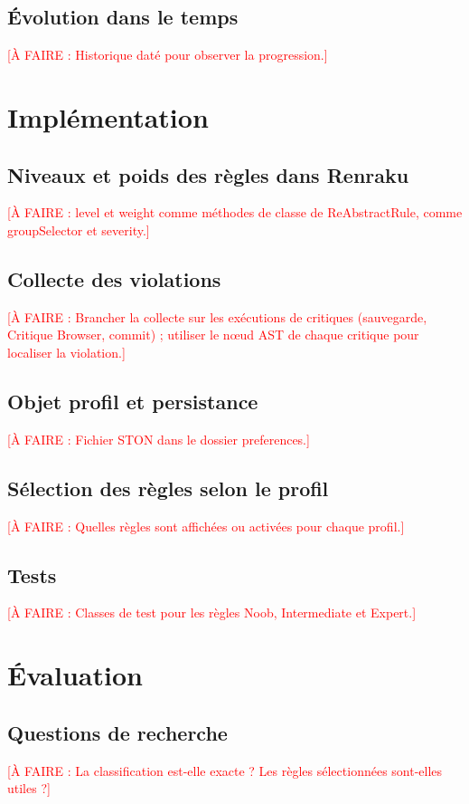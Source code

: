 \documentclass[11pt,a4paper]{report}
\newcommand{\todo}[1]{\textcolor{red}{[À FAIRE : #1]}}
\begin{document}
\section{Évolution dans le temps}
\todo{Historique daté pour observer la progression.}

\chapter{Implémentation}
\section{Niveaux et poids des règles dans Renraku}
\todo{level et weight comme méthodes de classe de ReAbstractRule, comme groupSelector et severity.}

\section{Collecte des violations}
\todo{Brancher la collecte sur les exécutions de critiques (sauvegarde, Critique Browser, commit) ; utiliser le nœud AST de chaque critique pour localiser la violation.}

\section{Objet profil et persistance}
\todo{Fichier STON dans le dossier preferences.}

\section{Sélection des règles selon le profil}
\todo{Quelles règles sont affichées ou activées pour chaque profil.}

\section{Tests}
\todo{Classes de test pour les règles Noob, Intermediate et Expert.}

\chapter{Évaluation}
\section{Questions de recherche}
\todo{La classification est-elle exacte ? Les règles sélectionnées sont-elles utiles ?}
\end{document}
